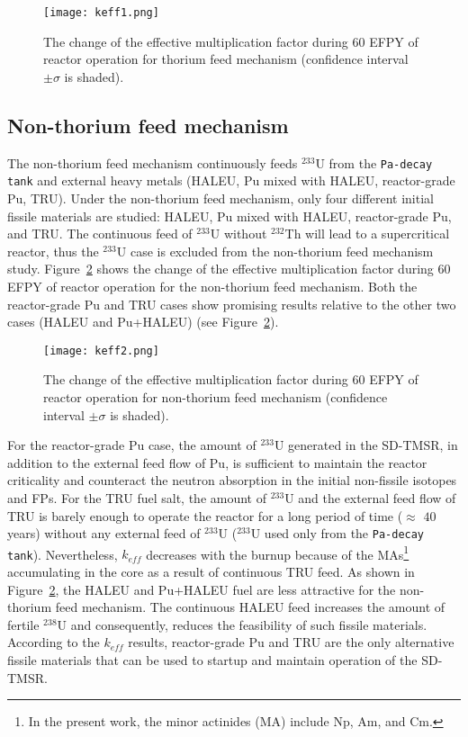 \begin{figure}
	\centering
	\texttt{[image: keff1.png]}
		\vspace{-0.5in}
	\caption{The change of the effective multiplication factor during 60 \gls{EFPY} of reactor operation for thorium feed mechanism (confidence interval $\pm\sigma$ is shaded).} 
	\label{fig:keff1}
\end{figure}

\subsection{Non-thorium feed mechanism}
The non-thorium feed mechanism continuously feeds 
$^{233}$U from the \texttt{Pa-decay tank} and external heavy metals (\gls{HALEU}, Pu mixed with \gls{HALEU}, reactor-grade Pu, \gls{TRU}).
Under the non-thorium feed mechanism, only four different initial fissile materials are studied: \gls{HALEU}, Pu mixed with \gls{HALEU}, reactor-grade Pu, and \gls{TRU}. The continuous feed of $^{233}$U 
without $^{232}$Th will lead to a supercritical reactor, thus the $^{233}$U case 
is excluded from the non-thorium feed mechanism study.
Figure~\ref{fig:keff2} shows the change of the effective multiplication factor 
during 60 \gls{EFPY} of reactor operation for the non-thorium feed mechanism. Both the reactor-grade Pu and TRU cases 
show promising results relative to the other two cases (HALEU and Pu+HALEU) (see Figure~\ref{fig:keff2}). 
\begin{figure}
	\centering
	\texttt{[image: keff2.png]}
			\vspace{-0.5in}
	\caption{The change of the effective multiplication factor during 60 
	\gls{EFPY} of reactor operation for non-thorium feed mechanism (confidence 
	interval $\pm\sigma$ is shaded).} 
	\label{fig:keff2}
\end{figure}
For the reactor-grade Pu case, the amount of $^{233}$U generated in the SD-TMSR, in addition to the external feed flow of Pu, is sufficient to maintain the reactor criticality and counteract the neutron absorption in the initial non-fissile isotopes and FPs. 
For the \gls{TRU} fuel salt, the amount of 
$^{233}$U and the external feed flow of TRU is barely enough to operate the 
reactor for a long period of time ($\approx$ $40$ years) without any 
external feed of $^{233}$U ($^{233}$U used only from the \texttt{Pa-decay tank}). Nevertheless, $k_{eff}$ decreases with the burnup 
because of the \glspl{MA}\footnote{In the present work, the minor actinides 
(MA) include Np, Am, and Cm.} accumulating in the core as a result of 
continuous TRU feed. As shown in Figure~\ref{fig:keff2}, the HALEU and Pu+HALEU 
fuel are less attractive for the non-thorium feed mechanism. The continuous HALEU 
feed increases the amount of fertile $^{238}$U and consequently, reduces the 
feasibility of such fissile materials. According to the $k_{eff}$ 
results, reactor-grade Pu and TRU are the only alternative fissile materials that  
can be used to startup and maintain operation of the SD-TMSR.

